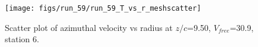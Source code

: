 \begin{figure}[H]
\centering
\texttt{[image: figs/run\_59/run\_59\_T\_vs\_r\_meshscatter]}
\caption{Scatter plot of azimuthal velocity vs radius at $z/c$=9.50, $V_{free}$=30.9, station 6.}
\label{fig:run_59_T_vs_r_meshscatter}
\end{figure}


